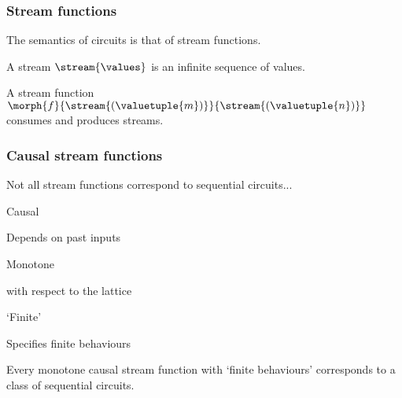 \begin{frame}
    \frametitle{Stream functions}

    The semantics of circuits is that of \alert{stream functions}.

    \wait

    A \alert{stream} \(\stream{\values}\) is an infinite sequence of values.
    
    \wait
    
    A \alert{stream function} \(\morph{f}{\stream{(\valuetuple{m})}}{\stream{(\valuetuple{n})}}\) consumes and produces streams.

\end{frame}

\begin{frame}
    \frametitle{Causal stream functions}

    Not all stream functions correspond to sequential circuits...

    \vspace{1em}
    \wait

    \begin{minipage}{0.3\textwidth}
        \alert{Causal}

        \small{Depends on past inputs}
    \end{minipage}
    \quad\wait
    \begin{minipage}{0.3\textwidth}
        \alert{Monotone}

        \small{with respect to the lattice}\normalsize
    \end{minipage}
    \quad\wait
    \begin{minipage}{0.3\textwidth}
        \alert{`Finite'}

        \small{Specifies finite behaviours}
    \end{minipage}
    
    \wait

    \begin{theorem}
        Every monotone causal stream function with `finite behaviours' corresponds to a class of sequential circuits. 
    \end{theorem}
\end{frame}